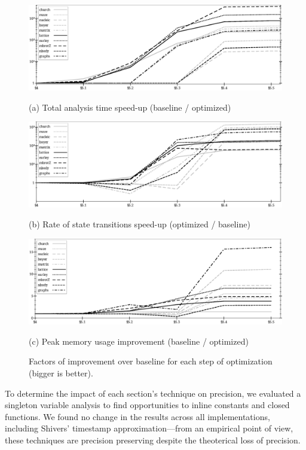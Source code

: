 \documentclass[preprint,onecolumn,9pt]{sigplanconf} %
\begin{document}
\begin{figure}
\begin{center}
  \includegraphics[width=6.5in]{all-relative-time}

  (a) Total analysis time speed-up (baseline / optimized)

  \vspace{1em}
  \includegraphics[width=6.5in]{all-relative-speed}

  (b) Rate of state transitions speed-up (optimized / baseline)

  \vspace{1em}
  \includegraphics[width=6.5in]{all-relative-space}

  (c) Peak memory usage improvement (baseline / optimized)
\end{center}
\caption{Factors of improvement over baseline for each step of optimization (bigger is better).}
\label{fig:bench-all}
\end{figure}

To determine the impact of each section's technique on precision, we evaluated a singleton variable analysis to find opportunities to inline constants and closed functions.
%
We found no change in the results across all implementations, including Shivers' timestamp approximation---from an empirical point of view, these techniques are precision preserving despite the theoterical loss of precision.
\end{document}

